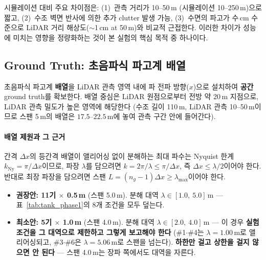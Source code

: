 \documentclass[11pt]{report}
\numberwithin{equation}{chapter}
\numberwithin{figure}{chapter}
\numberwithin{table}{chapter}
\begin{document}
시뮬레이션 대비 주요 차이점은:
(1)~관측 거리가 10--50\,m (시뮬레이션 10--250\,m)으로 짧고,
(2)~수조 벽면 반사에 의한 추가 clutter 발생 가능,
(3)~수면의 파고가 수\,cm 수준으로 LiDAR 거리 해상도($\sim$1\,cm at 50\,m)와
비교적 근접한다.
이러한 차이가 성능에 미치는 영향을 정량화하는 것이
본 실험의 핵심 목적 중 하나이다.

\subsection{Ground Truth: 초음파식 파고계 배열}

초음파식 파고계 \textbf{배열}을 LiDAR 관측 영역 내에 파 전파 방향($x$)으로 설치하여
\textbf{공간} ground truth를 확보한다.
배열 중심은 LiDAR 원점으로부터 전방 약 20\,m 지점으로,
LiDAR 관측 밀도가 높은 영역에 해당한다
(수조 길이 110\,m, LiDAR 관측 10--50\,m이므로 스팬 5\,m의 배열은 $17.5$--$22.5$\,m에 놓여
관측 구간 안에 들어간다).

\paragraph{배열 제원과 그 근거}
간격 $\Delta x$의 등간격 배열이 앨리어싱 없이 분해하는 최대 파수는 Nyquist 한계
$k_{\text{Ny}} = \pi/\Delta x$이므로, 파장 $\lambda$를 담으려면
$k = 2\pi/\lambda \le \pi/\Delta x$, 즉 $\Delta x \le \lambda/2$이어야 한다.
반대로 최장 파장을 담으려면 스팬 $L = (n_g - 1)\Delta x \ge \lambda_{\max}$이어야 한다.
\begin{itemize}
  \item \textbf{권장안: 11기 $\times$ 0.5\,m} (스팬 5.0\,m).
        분해 대역 $\lambda \in [1.0,\ 5.0]$\,m --- 표~\ref{tab:tank_phase1}의
        8개 조건을 모두 덮는다.
  \item \textbf{최소안: 5기 $\times$ 1.0\,m} (스팬 4.0\,m).
        분해 대역 $\lambda \in [2.0,\ 4.0]$\,m --- 이 경우
        \textbf{실험 조건을 그 대역으로 제한하고 그렇게 보고해야 한다}
        (\#1$\cdot$\#4는 $\lambda = 1.00$\,m로 앨리어싱되고,
        \#3$\cdot$\#6은 $\lambda = 5.06$\,m로 스팬을 넘는다).
        \textbf{하한만 걸고 상한을 걸지 않으면 안 된다} --- 스팬 4.0\,m는
        장파 쪽에서도 대역을 자른다.
\end{itemize}
\end{document}

